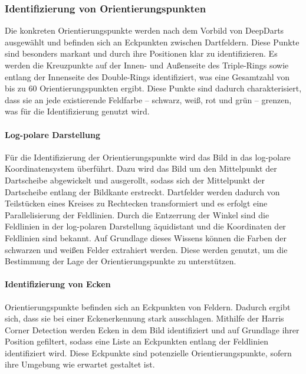\vfill
\newpage
\subsubsection{Identifizierung von Orientierungspunkten}
\label{sec:orientierungspunkte_finden}

Die konkreten Orientierungspunkte werden nach dem Vorbild von DeepDarts ausgewählt und befinden sich an Eckpunkten zwischen Dartfeldern. Diese Punkte sind besonders markant und durch ihre Positionen klar zu identifizieren. Es werden die Kreuzpunkte auf der Innen- und Außenseite des Triple-Rings sowie entlang der Innenseite des Double-Rings identifiziert, was eine Gesamtzahl von bis zu 60 Orientierungspunkten ergibt. Diese Punkte sind dadurch charakterisiert, dass sie an jede existierende Feldfarbe -- schwarz, weiß, rot und grün -- grenzen, was für die Identifizierung genutzt wird.

\paragraph{Log-polare Darstellung}

Für die Identifizierung der Orientierungspunkte wird das Bild in das log-polare Koordinatensystem überführt. Dazu wird das Bild um den Mittelpunkt der Dartscheibe abgewickelt und ausgerollt, sodass sich der Mittelpunkt der Dartscheibe entlang der Bildkante erstreckt. Dartfelder werden dadurch von Teilstücken eines Kreises zu Rechtecken transformiert und es erfolgt eine Parallelisierung der Feldlinien. Durch die Entzerrung der Winkel sind die Feldlinien in der log-polaren Darstellung äquidistant und die Koordinaten der Feldlinien sind bekannt. Auf Grundlage dieses Wissens können die Farben der schwarzen und weißen Felder extrahiert werden. Diese werden genutzt, um die Bestimmung der Lage der Orientierungspunkte zu unterstützen.

\paragraph{Identifizierung von Ecken}

Orientierungspunkte befinden sich an Eckpunkten von Feldern. Dadurch ergibt sich, dass sie bei einer Eckenerkennung stark ausschlagen. Mithilfe der Harris Corner Detection werden Ecken in dem Bild identifiziert und auf Grundlage ihrer Position gefiltert, sodass eine Liste an Eckpunkten entlang der Feldlinien identifiziert wird. Diese Eckpunkte sind potenzielle Orientierungspunkte, sofern ihre Umgebung wie erwartet gestaltet ist.

